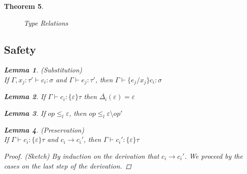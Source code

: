 \documentclass{article}
\newtheorem{theorem}{Theorem}[section]
\newtheorem{lemma}[theorem]{Lemma}
\begin{document}
\begin{theorem}
\begin{figure}[H]
\caption{Type Relations}
\label{wrap-static}
\end{figure}

\subsection{Safety}

\begin{lemma} (Substitution) \\
If $\Gamma, x_j : \tau' \vdash c_i : \sigma$ and $\Gamma \vdash e_j : \tau'$, then $\Gamma \vdash \{e_j/x_j\}c_i : \sigma$
\end{lemma}

\begin{lemma} 
\label{lemma-exact}
If $\Gamma \vdash c_i : \{\varepsilon\}\tau$ then $\overline{\Delta_i}(\varepsilon) = \varepsilon$
\end{lemma}

\begin{lemma}
\label{lemma-relation}
If $op \leq_{l} \varepsilon$, then $op \leq_{l} \varepsilon \setminus op'$
\end{lemma}

\begin{lemma} (Preservation) \\
If $\Gamma \vdash c_i : \{\varepsilon\} \tau$ and $c_i \longrightarrow c_i'$, then $\Gamma \vdash c_i' : \{\varepsilon\}\tau$

\begin{proof} (Sketch)
By induction on the derivation that $c_i \longrightarrow c_i'$. We proceed by the cases on the last step of the derivation.


\end{proof}
\end{lemma}
\end{theorem}
\end{document}
